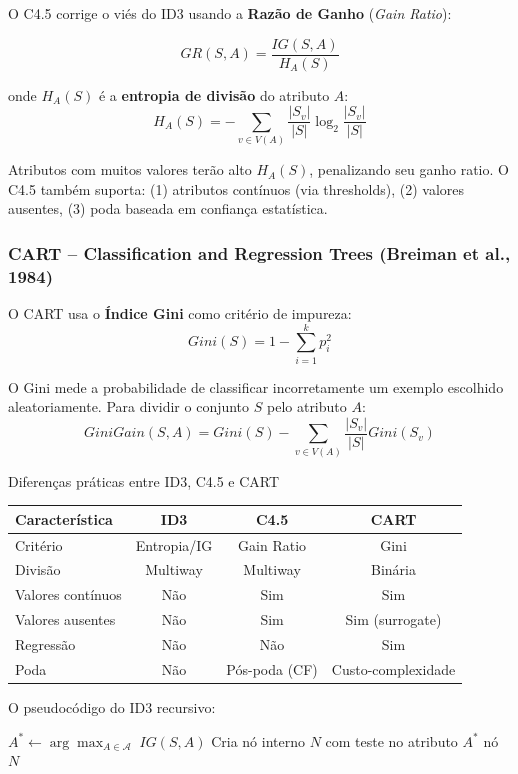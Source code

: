 \documentclass[12pt,a4paper]{article}
\begin{document}
O C4.5 corrige o viés do ID3 usando a \textbf{Razão de Ganho} (\textit{Gain Ratio}):

\[
  GR(S, A) = \frac{IG(S, A)}{H_A(S)}
\]

onde $H_A(S)$ é a \textbf{entropia de divisão} do atributo $A$:
\[
  H_A(S) = -\sum_{v \in V(A)} \frac{|S_v|}{|S|} \log_2 \frac{|S_v|}{|S|}
\]

Atributos com muitos valores terão alto $H_A(S)$, penalizando seu ganho ratio. O C4.5 também suporta: (1) atributos contínuos (via thresholds), (2) valores ausentes, (3) poda baseada em confiança estatística.

\subsubsection{CART -- Classification and Regression Trees (Breiman et al., 1984)}

O CART usa o \textbf{Índice Gini} como critério de impureza:
\[
  Gini(S) = 1 - \sum_{i=1}^{k} p_i^2
\]

O Gini mede a probabilidade de classificar incorretamente um exemplo escolhido aleatoriamente. Para dividir o conjunto $S$ pelo atributo $A$:
\[
  GiniGain(S, A) = Gini(S) - \sum_{v \in V(A)} \frac{|S_v|}{|S|} Gini(S_v)
\]

\begin{atencaobox}{Diferenças práticas entre ID3, C4.5 e CART}
\begin{tabular}{lccc}
\toprule
Característica & ID3 & C4.5 & CART \\
\midrule
Critério & Entropia/IG & Gain Ratio & Gini \\
Divisão & Multiway & Multiway & Binária \\
Valores contínuos & Não & Sim & Sim \\
Valores ausentes & Não & Sim & Sim (surrogate) \\
Regressão & Não & Não & Sim \\
Poda & Não & Pós-poda (CF) & Custo-complexidade \\
\bottomrule
\end{tabular}
\end{atencaobox}

O pseudocódigo do ID3 recursivo:

\begin{algorithm}[H]
\caption{Algoritmo ID3 Recursivo}
\SetAlgoLined
{}
\BlankLine
{}
$A^* \leftarrow \arg\max_{A \in \mathcal{A}}\; IG(S, A)$\;
Cria nó interno $N$ com teste no atributo $A^*$\;
\Return nó $N$\;
\end{algorithm}
\end{document}
